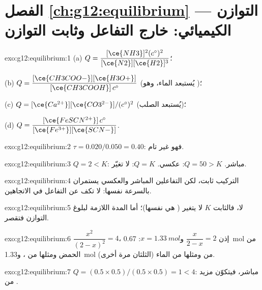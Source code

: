 \section*{الفصل \ref{ch:g12:equilibrium} --- التوازن الكيميائي: خارج التفاعل وثابت التوازن}

\begin{solution}{exo:g12:equilibrium:1}
(a) $Q = \dfrac{[\ce{NH3}]^2 (c^\circ)^2}{[\ce{N2}][\ce{H2}]^3}$؛\par
(b) $Q = \dfrac{[\ce{CH3COO-}][\ce{H3O+}]}{[\ce{CH3COOH}]\,c^\circ}$ (يُستبعد الماء،
وهو )؛\par
(c) $Q = [\ce{Ca^{2+}}][\ce{CO3^{2-}}]/(c^\circ)^2$ (يُستبعد الصلب)؛\par
(d) $Q = \dfrac{[\ce{FeSCN^{2+}}]\,c^\circ}{[\ce{Fe^{3+}}][\ce{SCN-}]}$.
\end{solution}

\begin{solution}{exo:g12:equilibrium:2}
$\tau = 0.020/0.050 = 0.40$: فهو غير تام.
\end{solution}

\begin{solution}{exo:g12:equilibrium:3}
$Q = 2 < K$: مباشر. $Q = 50 > K$: عكسي. $Q = K$: لا تغيّر.
\end{solution}

\begin{solution}{exo:g12:equilibrium:4}
التركيب ثابت، لكن التفاعلين المباشر والعكسي يستمران
بالسرعة نفسها:  لا تكف عن التفاعل في الاتجاهين.
\end{solution}

\begin{solution}{exo:g12:equilibrium:5}
لا، فالثابت $K$ لا يتغير ( هي نفسها)؛ أما المدة اللازمة لبلوغ
التوازن فتقصر.
\end{solution}

\begin{solution}{exo:g12:equilibrium:6}
$\dfrac{x^2}{(2-x)^2} = 4$، إذن $\dfrac{x}{2-x} = 2$
و$x = \qty{1.33}{mol}$: \qty{0.67}{mol} من الحمض ومثلها من ،
و\qty{1.33}{mol} من  ومثلها من الماء (الثلثان مرة أخرى).
\end{solution}

\begin{solution}{exo:g12:equilibrium:7}
$Q = (0.5 \times 0.5)/(0.5 \times 0.5) = 1 < 4$: مباشر، فيتكوّن مزيد من
.
\end{solution}

